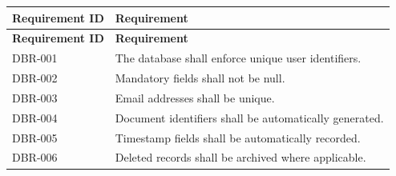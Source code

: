 \begin{longtable}{|p{3cm}|p{10cm}|}

\hline

\textbf{Requirement ID}

&

\textbf{Requirement}

\\

\hline

\endfirsthead

\hline

\textbf{Requirement ID}

&

\textbf{Requirement}

\\

\hline

\endhead

DBR-001

&

The database shall enforce unique user identifiers.

\\

\hline

DBR-002

&

Mandatory fields shall not be null.

\\

\hline

DBR-003

&

Email addresses shall be unique.

\\

\hline

DBR-004

&

Document identifiers shall be automatically generated.

\\

\hline

DBR-005

&

Timestamp fields shall be automatically recorded.

\\

\hline

DBR-006

&

Deleted records shall be archived where applicable.


\end{longtable}
